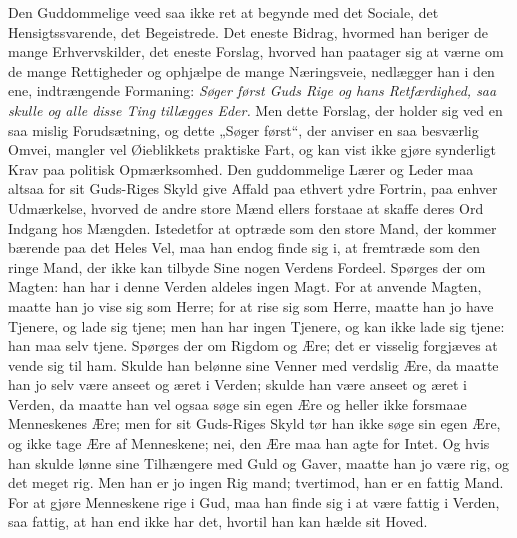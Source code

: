 \documentclass[12pt,a4paper]{book}
\begin{document}
Den Guddommelige veed saa ikke ret at begynde med det
Sociale, det Hensigtssvarende, det Begeistrede. Det eneste Bidrag, hvormed han beriger
de mange Erhvervskilder, det eneste Forslag, hvorved han paatager sig at værne om de
mange Rettigheder og ophjælpe de mange Næringsveie, nedlægger han i den ene,
indtrængende Formaning: \emph{Søger først Guds Rige og hans Retfærdighed, saa skulle og
alle disse Ting tillægges Eder.} Men dette Forslag, der holder sig ved en saa mislig
Forudsætning, og dette „Søger først“, der anviser en saa besværlig Omvei, mangler vel
Øieblikkets praktiske Fart, og kan vist ikke gjøre synderligt Krav paa politisk
Opmærksomhed. Den guddommelige Lærer og Leder maa altsaa for sit Guds-Riges Skyld give
Affald paa ethvert ydre Fortrin, paa enhver Udmærkelse, hvorved de andre store Mænd
ellers forstaae at skaffe deres Ord Indgang hos Mængden. Istedetfor at optræde som den
store Mand, der kommer bærende paa det Heles Vel, maa han endog finde sig i, at
fremtræde som den ringe Mand, der ikke kan tilbyde Sine nogen Verdens Fordeel. Spørges
der om Magten: han har i denne Verden aldeles ingen Magt. For at anvende Magten, maatte
han jo vise sig som Herre; for at rise sig som Herre, maatte han jo have Tjenere, og
lade sig tjene; men han har ingen Tjenere, og kan ikke lade sig tjene: han maa selv
tjene. Spørges der om Rigdom og Ære; det er visselig forgjæves at vende sig til ham.
Skulde han belønne sine Venner med verdslig Ære, da maatte han jo selv være anseet og
æret i Verden; skulde han være anseet og æret i Verden, da maatte han vel ogsaa søge sin
egen Ære og heller ikke forsmaae Menneskenes Ære; men for sit Guds-Riges Skyld tør han
ikke søge sin egen Ære, og ikke tage Ære af Menneskene; nei, den Ære maa han agte for
Intet. Og hvis han skulde lønne sine Tilhængere med Guld og Gaver, maatte han jo være
rig, og det meget rig. Men han er jo ingen Rig\-%
mand; tvertimod, han er en fattig Mand. For at gjøre Menneskene rige i Gud, maa han
finde sig i at være fattig i Verden, saa fattig, at han end ikke har det, hvortil han
kan hælde sit Hoved.
\end{document}

